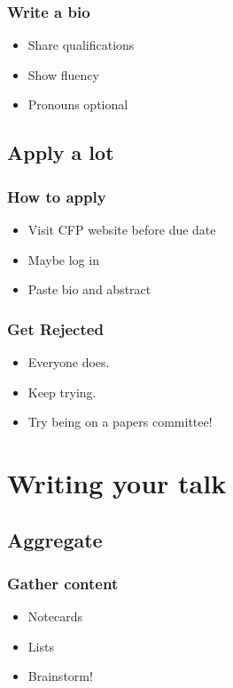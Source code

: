 \documentclass{beamer}
\begin{document}
\begin{frame}[fragile]
\frametitle{Write a bio}
\begin{itemize}[<+(1)->]
\item Share qualifications
\item Show fluency
\item Pronouns optional
\end{itemize}
\end{frame}

\subsection{Apply a lot}

\begin{frame}[fragile]
\frametitle{How to apply}
\begin{itemize}[<+(1)->]
\item Visit CFP website before due date
\item Maybe log in
\item Paste bio and abstract
\end{itemize}
\end{frame}


\begin{frame}[fragile]
\frametitle{Get Rejected}
\begin{itemize}[<+(1)->]
\item Everyone does.
\item Keep trying.
\item Try being on a papers committee!
\end{itemize}
\end{frame}


\section{Writing your talk}

\begin{frame}[fragile]
\tableofcontents[currentsubsection]
\end{frame}


\subsection{Aggregate}
\begin{frame}[fragile]
\frametitle{Gather content}
\begin{itemize}[<+(1)->]
\item Notecards
\item Lists
\item Brainstorm!
\end{itemize}
\end{frame}
\end{document}
